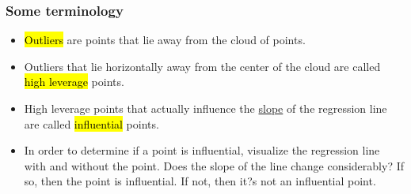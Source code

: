 \begin{frame}
\frametitle{Some terminology}
 
\begin{itemize}

\item \hl{Outliers} are points that lie away from the cloud  of points.

\pause

\item Outliers that lie horizontally away from the center of the cloud are called \hl{high leverage} points.

\pause

\item High leverage points that actually influence the \underline{slope} of the regression line are called \hl{influential} points.

\pause

\item In order to determine if a point is influential, visualize the regression line with and without the point. Does the slope of the line change considerably? If so, then the point is influential. If not, then it?s not an influential point.

\end{itemize}

\end{frame}


